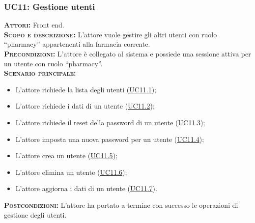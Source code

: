\subsubsection{UC11: Gestione utenti}
\label{sec:UC11}
\textsc{\textbf{Attori:}} Front end.\\
\textsc{\textbf{Scopo e descrizione:}} L'attore vuole gestire gli altri utenti con ruolo ``pharmacy'' appartenenti alla farmacia corrente.\\
\textsc{\textsc{\textbf{Precondizioni:}}} L'attore è collegato al sistema e possiede una sessione attiva per un utente con ruolo ``pharmacy''.\\
\textsc{\textbf{Scenario principale:}}
\begin{itemize}
    \item L'attore richiede la lista degli utenti (\hyperref[sec:UC111]{UC11.1});
    \item L'attore richiede i dati di un utente (\hyperref[sec:UC112]{UC11.2});
    \item L'attore richiede il reset della password di un utente (\hyperref[sec:UC113]{UC11.3});
    \item L'attore imposta una nuova password per un utente  (\hyperref[sec:UC114]{UC11.4});
    \item L'attore crea un utente (\hyperref[sec:UC115]{UC11.5});
    \item L'attore elimina un utente (\hyperref[sec:UC116]{UC11.6});
    \item L'attore aggiorna i dati di un utente (\hyperref[sec:UC117]{UC11.7}).
\end{itemize}
\textsc{\textbf{Postcondizioni:}} L'attore ha portato a termine con successo le operazioni di gestione degli utenti.

